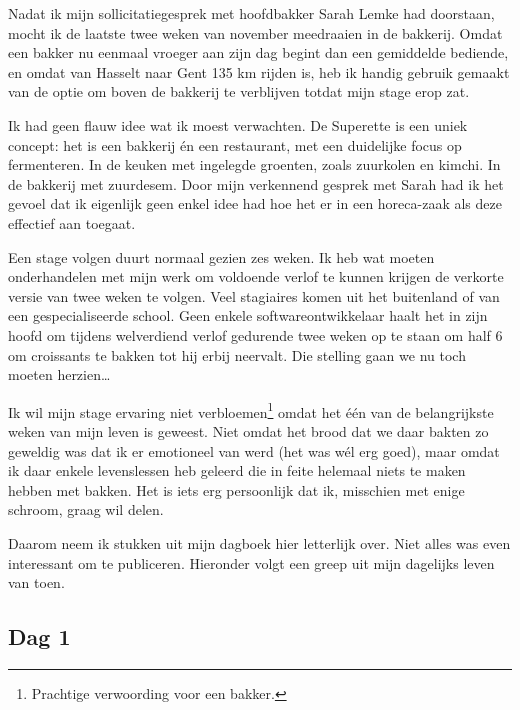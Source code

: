 \documentclass[
  11pt,
  dutch,
]{memoir}
\begin{document}
Nadat ik mijn sollicitatiegesprek met hoofdbakker Sarah Lemke had
doorstaan, mocht ik de laatste twee weken van november meedraaien in de
bakkerij. Omdat een bakker nu eenmaal vroeger aan zijn dag begint dan
een gemiddelde bediende, en omdat van Hasselt naar Gent 135 km rijden
is, heb ik handig gebruik gemaakt van de optie om boven de bakkerij te
verblijven totdat mijn stage erop zat.

Ik had geen flauw idee wat ik moest verwachten. De Superette is een
uniek concept: het is een bakkerij én een restaurant, met een duidelijke
focus op fermenteren. In de keuken met ingelegde groenten, zoals
zuurkolen en kimchi. In de bakkerij met zuurdesem. Door mijn verkennend
gesprek met Sarah had ik het gevoel dat ik eigenlijk geen enkel idee had
hoe het er in een horeca-zaak als deze effectief aan toegaat.

Een stage volgen duurt normaal gezien zes weken. Ik heb wat moeten
onderhandelen met mijn werk om voldoende verlof te kunnen krijgen de
verkorte versie van twee weken te volgen. Veel stagiaires komen uit het
buitenland of van een gespecialiseerde school. Geen enkele
softwareontwikkelaar haalt het in zijn hoofd om tijdens welverdiend
verlof gedurende twee weken op te staan om half 6 om croissants te
bakken tot hij erbij neervalt. Die stelling gaan we nu toch moeten
herzien\ldots{}

Ik wil mijn stage ervaring niet verbloemen\footnote{Prachtige
  verwoording voor een bakker.} omdat het één van de belangrijkste weken
van mijn leven is geweest. Niet omdat het brood dat we daar bakten zo
geweldig was dat ik er emotioneel van werd (het was wél erg goed), maar
omdat ik daar enkele levenslessen heb geleerd die in feite helemaal
niets te maken hebben met bakken. Het is iets erg persoonlijk dat ik,
misschien met enige schroom, graag wil delen.

Daarom neem ik stukken uit mijn dagboek hier letterlijk over. Niet alles
was even interessant om te publiceren. Hieronder volgt een greep uit
mijn dagelijks leven van toen.

\hypertarget{dag-1-1}{%
\subsection{Dag 1}\label{dag-1-1}}
\end{document}
